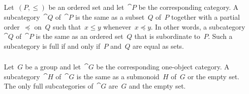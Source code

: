 \subsection{}



\subsubsection{}

Let~$(P, ≤)$ be an ordered set and let~$\cat{P}$ be the corresponding category.
A subcategory~$\cat{Q}$ of~$\cat{P}$ is the same as a subset~$Q$ of~$P$ together with a partial order~$\preceq$ on~$Q$ such that~$x ≤ y$ whenever~$x \preceq y$.
In other words, a subcategory~$\cat{Q}$ of~$\cat{P}$ is the same as an ordered set~$Q$ that is subordinate to~$P$.
Such a subcategory is full if and only if~$P$ and~$Q$ are equal as sets.



\subsubsection{}

Let~$G$ be a group and let~$\cat{G}$ be the corresponding one-object category.
A subcategory~$\cat{H}$ of~$\cat{G}$ is the same as a submonoid~$H$ of~$G$ or the empty set.
The only full subcategories of~$\cat{G}$ are~$G$ and the empty set.
